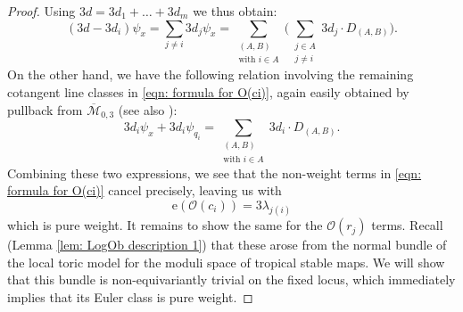 \documentclass[11pt]{amsart}
\theoremstyle{definition}
\theoremstyle{definition}
\newcommand{\ol}[1]{\overline{#1}}
\newcommand{\e}{\mathrm{e}}
\newcommand{\OO}{\mathcal{O}}
\newcommand{\Mcal}{\mathcal{M}}
\begin{document}
\begin{proof}
Using $3d=3d_1+\ldots+3d_m$ we thus obtain:
\begin{equation*} (3d -3d_i) \psi_x = \sum_{j \neq i} 3d_j \psi_x = \sum_{\substack{(A,B) \\ \text{with } i \in A}}\bigg( \sum_{\substack{j \in A \\ j \neq i}} 3d_j\cdot D_{(A,B)} \bigg).\end{equation*}
On the other hand, we have the following relation involving the remaining cotangent line classes in \eqref{eqn: formula for O(ci)}, again easily obtained by pullback from $\ol\Mcal_{0,3}$ (see also \cite{LeePandharipande}):
\begin{equation*} 3d_i \psi_x + 3d_i \psi_{q_i} = \sum_{\substack{(A,B) \\ \text{with } i \in A}} 3d_i \cdot D_{(A,B)}.\end{equation*}
Combining these two expressions, we see that the non-weight terms in \eqref{eqn: formula for O(ci)} cancel precisely, leaving us with
\begin{equation*} \e(\OO(c_i)) = 3\lambda_{j(i)} \end{equation*}
which is pure weight. It remains to show the same for the $\OO(r_j)$ terms. Recall (Lemma \ref{lem: LogOb description 1}) that these arose from the normal bundle of the local toric model for the moduli space of tropical stable maps. We will show that this bundle is non-equivariantly trivial on the fixed locus, which immediately implies that its Euler class is pure weight.


\end{proof}
\end{document}
